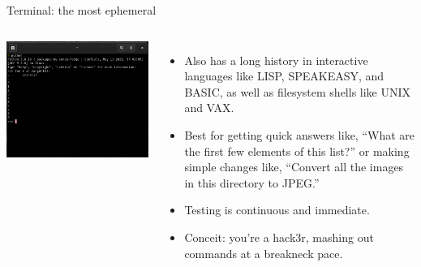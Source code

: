 \documentclass[aspectratio=169]{beamer}
\begin{document}
\begin{frame}{Terminal: the most ephemeral}
\vspace{0.2 cm}
\begin{columns}
\includegraphics[width=\linewidth]{img/fundamental-3-modes-terminal.png}

\large
\begin{itemize}\setlength{\itemsep}{0.25 cm}
\item<1-> Also has a long history in interactive languages like LISP, SPEAKEASY, and BASIC, as well as filesystem shells like UNIX and VAX.
\item<2-> Best for getting quick answers like, ``What are the first few elements of this list?'' or making simple changes like, ``Convert all the images in this directory to JPEG.''
\item<3-> Testing is continuous and immediate.
\item<4-> Conceit: you're a hack3r, mashing out commands at a breakneck pace.
\end{itemize}
\end{columns}
\end{frame}
\end{document}
